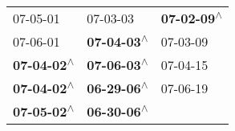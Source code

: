 \begin{supertabular}{lll}
                  07-05-01\textsuperscript{} &                   07-03-03\textsuperscript{} &  \textbf{07-02-09\textsuperscript{$\wedge$}} \\
                  07-06-01\textsuperscript{} &  \textbf{07-04-03\textsuperscript{$\wedge$}} &                   07-03-09\textsuperscript{} \\
 \textbf{07-04-02\textsuperscript{$\wedge$}} &  \textbf{07-06-03\textsuperscript{$\wedge$}} &                   07-04-15\textsuperscript{} \\
 \textbf{07-04-02\textsuperscript{$\wedge$}} &  \textbf{06-29-06\textsuperscript{$\wedge$}} &                   07-06-19\textsuperscript{} \\
 \textbf{07-05-02\textsuperscript{$\wedge$}} &  \textbf{06-30-06\textsuperscript{$\wedge$}} &                                              \\
\end{supertabular}
